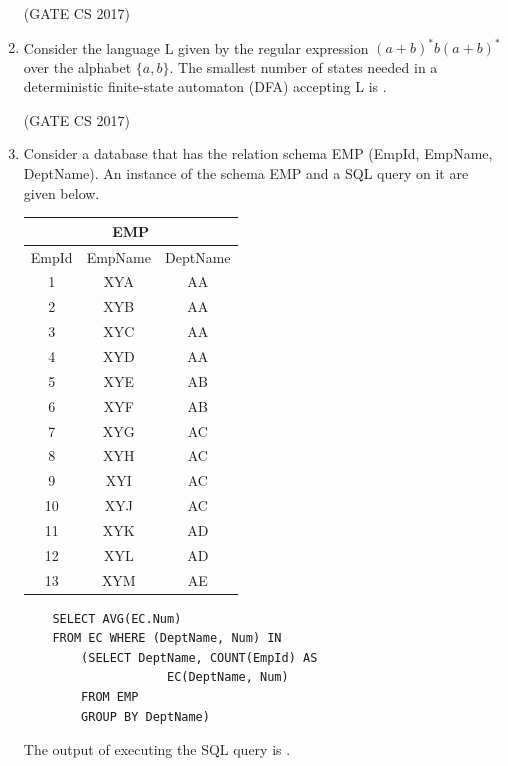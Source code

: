 \documentclass[a4paper, 11pt]{article}
\begin{document}
\begin{enumerate}
    \hfill (GATE CS 2017)
    
    \item Consider the language L given by the regular expression $(a+b)^{*}b(a+b)^{*}$ over the alphabet $\{a,b\}$. The smallest number of states needed in a deterministic finite-state automaton (DFA) accepting L is \underline{\hspace{2cm}}.
    
    \hfill (GATE CS 2017)
    
    \item Consider a database that has the relation schema EMP (EmpId, EmpName, DeptName). An instance of the schema EMP and a SQL query on it are given below.\\
    \begin{minipage}[t]{0.48\textwidth}
        \begin{tabular}{|c|c|c|}
        \hline
        \multicolumn{3}{|c|}{EMP}\\
        \hline
        EmpId & EmpName & DeptName \\
        \hline
         1 & XYA & AA \\
         2 & XYB & AA \\
         3 & XYC & AA \\
         4 & XYD & AA \\
         5 & XYE & AB \\
         6 & XYF & AB \\
         7 & XYG & AC \\
         8 & XYH & AC \\
         9 & XYI & AC \\
         10 & XYJ & AC \\
         11 & XYK & AD \\
         12 & XYL & AD \\
         13 & XYM & AE \\
        \hline
    \end{tabular}
    \end{minipage}
    \begin{minipage}[t]{0.48\textwidth}
        \begin{lstlisting}
    SELECT AVG(EC.Num)
    FROM EC WHERE (DeptName, Num) IN
        (SELECT DeptName, COUNT(EmpId) AS 
                    EC(DeptName, Num)
        FROM EMP 
        GROUP BY DeptName)
    \end{lstlisting}
    \end{minipage}
    
    
    The output of executing the SQL query is \underline{\hspace{2cm}}.
    

\end{enumerate}
\end{document}
